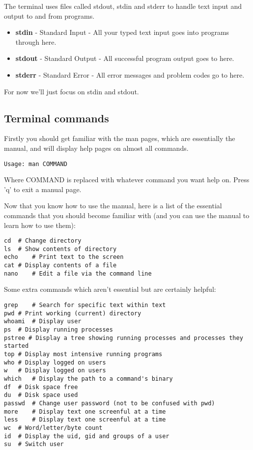\documentclass{article}
\begin{document}
The terminal uses files called stdout, stdin and stderr to handle text input and output to and from programs.

\begin{itemize}
\item \textbf{stdin} - Standard Input - All your typed text input goes into programs through here.
\item \textbf{stdout} - Standard Output - All successful program output goes to here.
\item \textbf{stderr} - Standard Error - All error messages and problem codes go to here. 
\end{itemize}
For now we'll just focus on stdin and stdout.

\subsection{Terminal commands}
Firstly you should get familiar with the man pages, which are essentially the manual, and will display help pages on almost all commands.
\begin{verbatim}
Usage: man COMMAND
\end{verbatim}
Where COMMAND is replaced with whatever command you want help on. Press 'q' to exit a manual page.

Now that you know how to use the manual, here is a list of the essential commands that you should become familiar with (and you can use the manual to learn how to use them): 
\begin{verbatim}
cd	# Change directory
ls	# Show contents of directory
echo	# Print text to the screen
cat	# Display contents of a file
nano	# Edit a file via the command line
\end{verbatim}
Some extra commands which aren't essential but are certainly helpful:
\begin{verbatim}
grep	# Search for specific text within text
pwd	# Print working (current) directory
whoami	# Display user
ps	# Display running processes
pstree # Display a tree showing running processes and processes they started
top # Display most intensive running programs
who	# Display logged on users
w	# Display logged on users
which	# Display the path to a command's binary
df	# Disk space free
du	# Disk space used
passwd	# Change user password (not to be confused with pwd)
more	# Display text one screenful at a time
less	# Display text one screenful at a time
wc	# Word/letter/byte count
id	# Display the uid, gid and groups of a user
su	# Switch user
\end{verbatim}
\end{document}
